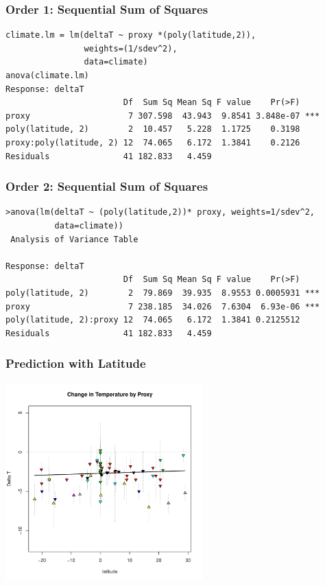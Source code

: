 \documentclass[handout]{beamer}
\begin{document}
\begin{frame}[fragile]
  \frametitle{Order 1: Sequential Sum of Squares }
  \begin{small}
\begin{verbatim}
climate.lm = lm(deltaT ~ proxy *(poly(latitude,2)),
                weights=(1/sdev^2),
                data=climate)
anova(climate.lm)
Response: deltaT
                        Df  Sum Sq Mean Sq F value    Pr(>F)
proxy                    7 307.598  43.943  9.8541 3.848e-07 ***
poly(latitude, 2)        2  10.457   5.228  1.1725    0.3198
proxy:poly(latitude, 2) 12  74.065   6.172  1.3841    0.2126
Residuals               41 182.833   4.459
\end{verbatim}

\end{small}

\end{frame}

\begin{frame}[fragile]
 \frametitle{Order 2: Sequential Sum of Squares}
   \begin{small}
\begin{verbatim}
>anova(lm(deltaT ~ (poly(latitude,2))* proxy, weights=1/sdev^2,
          data=climate))
 Analysis of Variance Table

Response: deltaT
                        Df  Sum Sq Mean Sq F value    Pr(>F)
poly(latitude, 2)        2  79.869  39.935  8.9553 0.0005931 ***
proxy                    7 238.185  34.026  7.6304  6.93e-06 ***
poly(latitude, 2):proxy 12  74.065   6.172  1.3841 0.2125512
Residuals               41 182.833   4.459
\end{verbatim}
\end{small}
\end{frame}

\begin{frame}
  \frametitle{Prediction with Latitude}
  \centerline{\includegraphics[height=3in]{pred-temp-lat}}
\end{frame}
\end{document}
